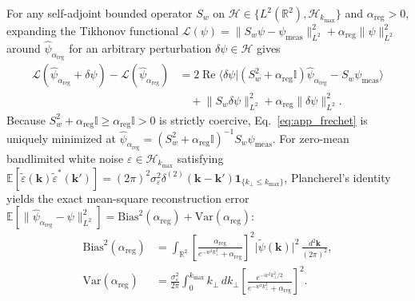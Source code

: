 \documentclass[aps,pra,onecolumn,notitlepage,11pt,tightenlines,nofootinbib,floatfix,longbibliography]{revtex4-2}
\theoremstyle{remark}
\newcommand{\braket}[2]{\langle #1 | #2 \rangle}
\newcommand{\norm}[1]{\lVert #1 \rVert}
\newcommand{\abs}[1]{\lvert #1 \rvert}
\begin{document}
For any self-adjoint bounded operator $S_w$ on $\mathcal{H} \in \{L^2(\mathbb{R}^2), \mathcal{H}_{k_{\max}}\}$ and $\alpha_{\mathrm{reg}} > 0$, expanding the Tikhonov functional $\mathcal{L}(\psi) = \norm{S_w\psi - \psi_{\mathrm{meas}}}_{L^2}^2 + \alpha_{\mathrm{reg}}\norm{\psi}_{L^2}^2$ around $\hat{\psi}_{\alpha_{\mathrm{reg}}}$ for an arbitrary perturbation $\delta\psi \in \mathcal{H}$ gives
\begin{align}
\mathcal{L}(\hat{\psi}_{\alpha_{\mathrm{reg}}}+\delta\psi) - \mathcal{L}(\hat{\psi}_{\alpha_{\mathrm{reg}}}) &= 2\operatorname{Re}\braket{\delta\psi}{(S_w^2 + \alpha_{\mathrm{reg}}\mathbb{I})\hat{\psi}_{\alpha_{\mathrm{reg}}} - S_w\psi_{\mathrm{meas}}} \nonumber \\
&\quad + \norm{S_w\delta\psi}_{L^2}^2 + \alpha_{\mathrm{reg}}\norm{\delta\psi}_{L^2}^2.
\label{eq:app_frechet}
\end{align}
Because $S_w^2 + \alpha_{\mathrm{reg}}\mathbb{I} \ge \alpha_{\mathrm{reg}}\mathbb{I} > 0$ is strictly coercive, Eq.~\eqref{eq:app_frechet} is uniquely minimized at $\hat{\psi}_{\alpha_{\mathrm{reg}}} = (S_w^2 + \alpha_{\mathrm{reg}}\mathbb{I})^{-1}S_w\psi_{\mathrm{meas}}$. For zero-mean bandlimited white noise $\varepsilon \in \mathcal{H}_{k_{\max}}$ satisfying $\mathbb{E}[\widetilde{\varepsilon}(\mathbf{k})\widetilde{\varepsilon}^*(\mathbf{k}')] = (2\pi)^2\sigma_\varepsilon^2\delta^{(2)}(\mathbf{k}-\mathbf{k}')\mathbf{1}_{\{k_\perp \le k_{\max}\}}$, Plancherel's identity yields the exact mean-square reconstruction error $\mathbb{E}[\norm{\hat{\psi}_{\alpha_{\mathrm{reg}}} - \psi}_{L^2}^2] = \mathrm{Bias}^2(\alpha_{\mathrm{reg}}) + \mathrm{Var}(\alpha_{\mathrm{reg}})$:
\begin{align}
\mathrm{Bias}^2(\alpha_{\mathrm{reg}}) &= \int_{\mathbb{R}^2} \left[\frac{\alpha_{\mathrm{reg}}}{e^{-w^2 k_\perp^2} + \alpha_{\mathrm{reg}}}\right]^2 \abs{\widetilde{\psi}(\mathbf{k})}^2\,\frac{d^2\mathbf{k}}{(2\pi)^2}, \nonumber \\
\mathrm{Var}(\alpha_{\mathrm{reg}}) &= \frac{\sigma_\varepsilon^2}{2\pi}\int_0^{k_{\max}} k_\perp\,dk_\perp \left[\frac{e^{-w^2 k_\perp^2/2}}{e^{-w^2 k_\perp^2} + \alpha_{\mathrm{reg}}}\right]^2.
\label{eq:app_bias_var_general}
\end{align}
\end{document}
